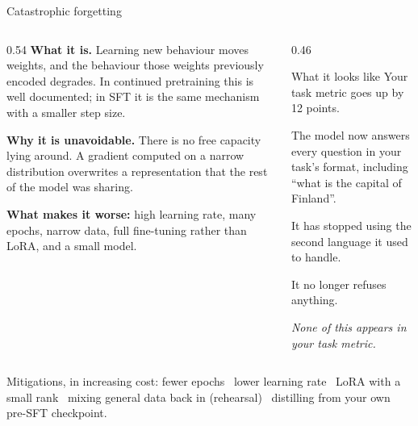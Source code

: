 \documentclass[aspectratio=169,10pt]{beamer}
\begin{document}
\begin{frame}[shrink=4]{Catastrophic forgetting}
  \begin{columns}[T]
    \begin{column}{0.54\textwidth}
      \textbf{What it is.} Learning new behaviour moves weights, and the
      behaviour those weights previously encoded degrades. In continued
      pretraining this is well documented; in SFT it is the same mechanism
      with a smaller step size.
      \vspace{0.5em}

      \textbf{Why it is unavoidable.} There is no free capacity lying around.
      A gradient computed on a narrow distribution overwrites a representation
      that the rest of the model was sharing.
      \vspace{0.5em}

      \textbf{What makes it worse:} high learning rate, many epochs, narrow
      data, full fine-tuning rather than LoRA, and a small model.
    \end{column}
    \begin{column}{0.46\textwidth}
      \begin{block}{What it looks like}
        \small
        Your task metric goes up by 12 points.

        The model now answers every question in your task's format, including
        ``what is the capital of Finland''.

        It has stopped using the second language it used to handle.

        It no longer refuses anything.

        \textit{None of this appears in your task metric.}
      \end{block}
    \end{column}
  \end{columns}
  \vspace{0.3em}
  \raggedright
  \small
  Mitigations, in increasing cost: fewer epochs \textbullet\ lower learning
  rate \textbullet\ LoRA with a small rank \textbullet\ mixing general data
  back in (rehearsal) \textbullet\ distilling from your own pre-SFT checkpoint.
\end{frame}
\end{document}
